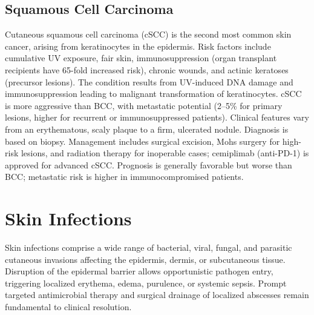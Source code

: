 \subsection{Squamous Cell Carcinoma}
\label{sec:Squamous Cell Carcinoma}
Cutaneous squamous cell carcinoma (cSCC) is the second most common skin cancer, arising from keratinocytes in the epidermis. Risk factors include cumulative UV exposure, fair skin, immunosuppression (organ transplant recipients have 65-fold increased risk), chronic wounds, and actinic keratoses (precursor lesions). The condition results from UV-induced DNA damage and immunosuppression leading to malignant transformation of keratinocytes. cSCC is more aggressive than BCC, with metastatic potential (2--5\% for primary lesions, higher for recurrent or immunosuppressed patients). Clinical features vary from an erythematous, scaly plaque to a firm, ulcerated nodule. Diagnosis is based on biopsy. Management includes surgical excision, Mohs surgery for high-risk lesions, and radiation therapy for inoperable cases; cemiplimab (anti-PD-1) is approved for advanced cSCC. Prognosis is generally favorable but worse than BCC; metastatic risk is higher in immunocompromised patients.

\section{Skin Infections}




Skin infections comprise a wide range of bacterial, viral, fungal, and parasitic cutaneous invasions affecting the epidermis, dermis, or subcutaneous tissue. Disruption of the epidermal barrier allows opportunistic pathogen entry, triggering localized erythema, edema, purulence, or systemic sepsis. Prompt targeted antimicrobial therapy and surgical drainage of localized abscesses remain fundamental to clinical resolution.



